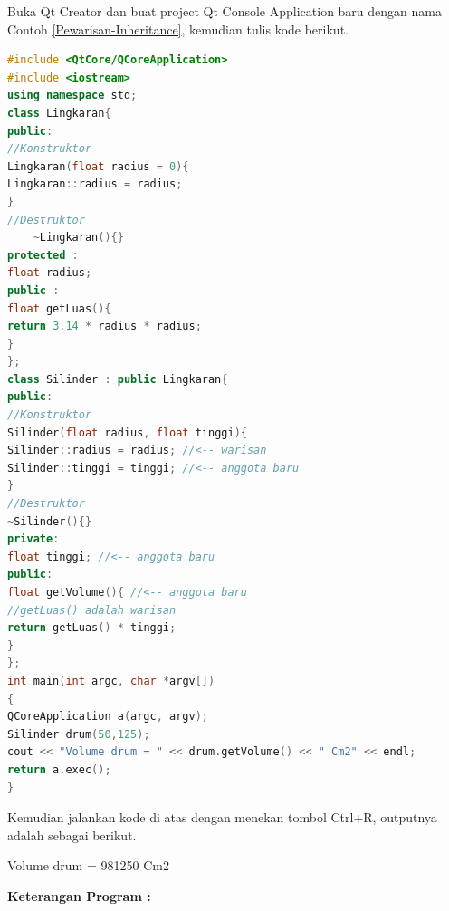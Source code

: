Buka Qt Creator dan buat project Qt Console Application baru dengan nama
Contoh \ref{Pewarisan-Inheritance}, kemudian tulis kode berikut.

\begin{lstlisting}[language=c++, caption=Pewarisan (Inheritance), label=Pewarisan-Inheritance]
#include <QtCore/QCoreApplication>
#include <iostream>
using namespace std;
class Lingkaran{
public:
//Konstruktor
Lingkaran(float radius = 0){
Lingkaran::radius = radius;
}
//Destruktor
    ~Lingkaran(){}
protected :
float radius;
public :
float getLuas(){
return 3.14 * radius * radius;
}
};
class Silinder : public Lingkaran{
public:
//Konstruktor
Silinder(float radius, float tinggi){
Silinder::radius = radius; //<-- warisan
Silinder::tinggi = tinggi; //<-- anggota baru
}
//Destruktor
~Silinder(){}
private:
float tinggi; //<-- anggota baru
public:
float getVolume(){ //<-- anggota baru
//getLuas() adalah warisan
return getLuas() * tinggi;
}
};
int main(int argc, char *argv[])
{
QCoreApplication a(argc, argv);
Silinder drum(50,125);
cout << "Volume drum = " << drum.getVolume() << " Cm2" << endl;
return a.exec();
}
\end{lstlisting}

Kemudian jalankan kode di atas dengan menekan tombol Ctrl+R, outputnya
adalah sebagai berikut.

\begin{lcverbatim}
Volume drum = 981250 Cm2
\end{lcverbatim}

\textbf{Keterangan Program :}


